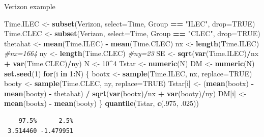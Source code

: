 \documentclass[
  ignorenonframetext,
]{beamer}
\newenvironment{Shaded}{\begin{snugshade}}{\end{snugshade}}
\newcommand{\AttributeTok}[1]{\textcolor[rgb]{0.13,0.29,0.53}{#1}}
\newcommand{\CommentTok}[1]{\textcolor[rgb]{0.56,0.35,0.01}{\textit{#1}}}
\newcommand{\ConstantTok}[1]{\textcolor[rgb]{0.56,0.35,0.01}{#1}}
\newcommand{\ControlFlowTok}[1]{\textcolor[rgb]{0.13,0.29,0.53}{\textbf{#1}}}
\newcommand{\DecValTok}[1]{\textcolor[rgb]{0.00,0.00,0.81}{#1}}
\newcommand{\FunctionTok}[1]{\textcolor[rgb]{0.13,0.29,0.53}{\textbf{#1}}}
\newcommand{\NormalTok}[1]{#1}
\newcommand{\OtherTok}[1]{\textcolor[rgb]{0.56,0.35,0.01}{#1}}
\newcommand{\SpecialCharTok}[1]{\textcolor[rgb]{0.81,0.36,0.00}{\textbf{#1}}}
\newcommand{\StringTok}[1]{\textcolor[rgb]{0.31,0.60,0.02}{#1}}
\begin{document}
\begin{frame}[fragile]{Verizon example}
\protect\hypertarget{verizon-example}{}
\tiny

\begin{Shaded}
\begin{Highlighting}[]
\NormalTok{Time.ILEC }\OtherTok{\textless{}{-}} \FunctionTok{subset}\NormalTok{(Verizon, }\AttributeTok{select=}\NormalTok{Time, Group }\SpecialCharTok{==} \StringTok{"ILEC"}\NormalTok{, }\AttributeTok{drop=}\ConstantTok{TRUE}\NormalTok{)}
\NormalTok{Time.CLEC }\OtherTok{\textless{}{-}} \FunctionTok{subset}\NormalTok{(Verizon, }\AttributeTok{select=}\NormalTok{Time, Group }\SpecialCharTok{==} \StringTok{"CLEC"}\NormalTok{, }\AttributeTok{drop=}\ConstantTok{TRUE}\NormalTok{)}
\NormalTok{thetahat }\OtherTok{\textless{}{-}} \FunctionTok{mean}\NormalTok{(Time.ILEC) }\SpecialCharTok{{-}} \FunctionTok{mean}\NormalTok{(Time.CLEC)}
\NormalTok{nx }\OtherTok{\textless{}{-}} \FunctionTok{length}\NormalTok{(Time.ILEC)  }\CommentTok{\#nx=1664}
\NormalTok{ny }\OtherTok{\textless{}{-}} \FunctionTok{length}\NormalTok{(Time.CLEC)  }\CommentTok{\#ny=23}
\NormalTok{SE }\OtherTok{\textless{}{-}} \FunctionTok{sqrt}\NormalTok{(}\FunctionTok{var}\NormalTok{(Time.ILEC)}\SpecialCharTok{/}\NormalTok{nx }\SpecialCharTok{+} \FunctionTok{var}\NormalTok{(Time.CLEC)}\SpecialCharTok{/}\NormalTok{ny)}
\NormalTok{N }\OtherTok{\textless{}{-}} \DecValTok{10}\SpecialCharTok{\^{}}\DecValTok{4}
\NormalTok{Tstar }\OtherTok{\textless{}{-}} \FunctionTok{numeric}\NormalTok{(N)}
\NormalTok{DM }\OtherTok{\textless{}{-}} \FunctionTok{numeric}\NormalTok{(N)}
\FunctionTok{set.seed}\NormalTok{(}\DecValTok{1}\NormalTok{)}
\ControlFlowTok{for}\NormalTok{(i }\ControlFlowTok{in} \DecValTok{1}\SpecialCharTok{:}\NormalTok{N)}
\NormalTok{\{}
\NormalTok{  bootx }\OtherTok{\textless{}{-}} \FunctionTok{sample}\NormalTok{(Time.ILEC, nx, }\AttributeTok{replace=}\ConstantTok{TRUE}\NormalTok{)}
\NormalTok{  booty }\OtherTok{\textless{}{-}} \FunctionTok{sample}\NormalTok{(Time.CLEC, ny, }\AttributeTok{replace=}\ConstantTok{TRUE}\NormalTok{)}
\NormalTok{  Tstar[i] }\OtherTok{\textless{}{-}}\NormalTok{ (}\FunctionTok{mean}\NormalTok{(bootx) }\SpecialCharTok{{-}} \FunctionTok{mean}\NormalTok{(booty) }\SpecialCharTok{{-}}\NormalTok{ thetahat) }\SpecialCharTok{/}
    \FunctionTok{sqrt}\NormalTok{(}\FunctionTok{var}\NormalTok{(bootx)}\SpecialCharTok{/}\NormalTok{nx }\SpecialCharTok{+} \FunctionTok{var}\NormalTok{(booty)}\SpecialCharTok{/}\NormalTok{ny)}
\NormalTok{  DM[i] }\OtherTok{\textless{}{-}} \FunctionTok{mean}\NormalTok{(bootx) }\SpecialCharTok{{-}} \FunctionTok{mean}\NormalTok{(booty)}
\NormalTok{\}}
\FunctionTok{quantile}\NormalTok{(Tstar, }\FunctionTok{c}\NormalTok{(.}\DecValTok{975}\NormalTok{, .}\DecValTok{025}\NormalTok{))}
\end{Highlighting}
\end{Shaded}

\begin{verbatim}
    97.5%      2.5% 
 3.514460 -1.479951 
\end{verbatim}

\normalsize
\end{frame}
\end{document}
